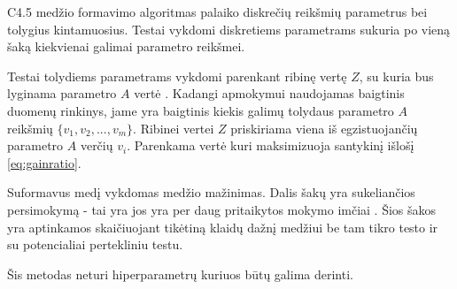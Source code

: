 C4.5 medžio formavimo algoritmas palaiko diskrečių reikšmių parametrus bei tolygius kintamuosius.
Testai vykdomi diskretiems parametrams sukuria po vieną šaką kiekvienai galimai parametro reikšmei.

Testai tolydiems parametrams vykdomi parenkant ribinę vertę $Z$, su kuria bus lyginama parametro
$A$ vertė \cite{c45}. Kadangi apmokymui naudojamas baigtinis duomenų rinkinys, jame yra baigtinis
kiekis galimų tolydaus parametro $A$ reikšmių $\{v_1, v_2, ..., v_m\}$. Ribinei vertei $Z$ priskiriama
viena iš egzistuojančių parametro $A$ verčių  $v_i$. Parenkama vertė kuri maksimizuoja
santykinį išlošį \ref{eq:gainratio}.

Suformavus medį vykdomas medžio mažinimas. Dalis šakų yra sukeliančios persimokymą - tai yra
jos yra per daug pritaikytos mokymo imčiai \cite{c45}. Šios šakos yra aptinkamos skaičiuojant
tikėtiną klaidų dažnį medžiui be tam tikro testo ir su potencialiai pertekliniu testu.

Šis metodas neturi hiperparametrų kuriuos būtų galima derinti.

